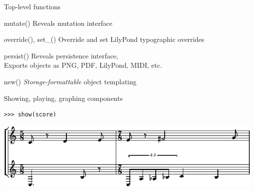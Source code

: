 \begin{frame}[fragile]{Top-level functions}
    \begin{block}{mutate()}
        Reveals mutation interface
    \end{block}
    \begin{block}{override(), set\_()}
        Override and set LilyPond typographic overrides
    \end{block}
    \begin{block}{persist()}
        Reveals persistence interface,\\
        Exports objects as PNG, PDF, LilyPond, MIDI, etc.
    \end{block}
    \begin{block}{new()}
        \emph{Storage-formattable} object templating
    \end{block}
\end{frame}

\begin{frame}[fragile]{Showing, playing, graphing components}

\begin{abjadbookoutput}
\begin{singlespacing}
\vspace{-0.5\baselineskip}
\begin{verbatim}
>>> show(score)
\end{verbatim}
\noindent\includegraphics[max width=\textwidth,]{assets/lilypond-e3b1c40a4191d3949ecaa427d7f31b59.pdf}
\end{singlespacing}
\end{abjadbookoutput}

\end{frame}

